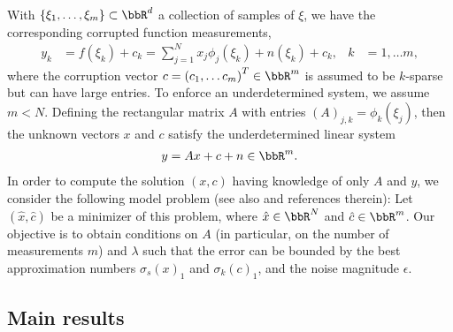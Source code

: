 With $\left\{\xi_1, \ldots, \xi_m\right\} \subset \bbR^d$ a collection of samples of $\xi$, we have the corresponding corrupted function measurements,
\begin{align*}
  y_k &= f(\xi_k) + c_k = \sum_{j=1}^N x_j \phi_j\left(\xi_k\right) + n\left(\xi_k\right) + c_k, & k&=1, \ldots m,
\end{align*}
where the corruption vector $c = \left(c_1, \ldots c_m \right)^T \in \bbR^m$ is assumed to be $k$-sparse but can have large entries. %
To enforce an underdetermined system, we assume $m < N$. Defining the rectangular matrix $A$ with entries $(A)_{j,k} = \phi_k\left(\xi_j\right)$, then the unknown vectors $x$ and $c$ satisfy the underdetermined linear system
\begin{align}\label{eq:linear-system}
  y = A x + c + n \in \bbR^m.
\end{align}
In order to compute the solution $(x,c)$ having knowledge of only $A$ and $y$, we consider the following model problem (see also \cite{LiCorruptionsConstrApprox} and references therein):
Let $(\hat{x},\hat{c})$ be a minimizer of this problem, where $\hat{x} \in \bbR^N$ and $\hat{c} \in \bbR^m$.  Our objective is to obtain conditions on $A$ (in particular, on the number of measurements $m$) and $\lambda$ such that the error
can be bounded by the best approximation numbers $\sigma_{s}(x)_1$ and $\sigma_{k}(c)_1$, and the noise magnitude $\epsilon$. 

\subsection{Main results}

